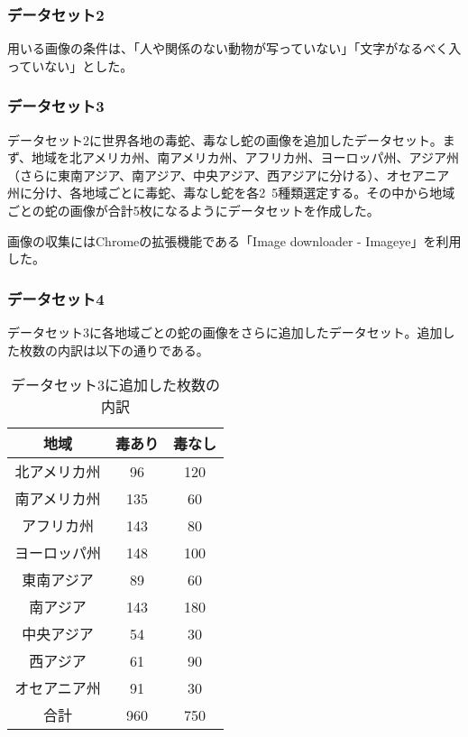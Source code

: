 \documentclass[a4paper, 11pt, titlepage]{jsarticle}
\begin{document}
\subsubsection{データセット2}
用いる画像の条件は、「人や関係のない動物が写っていない」「文字がなるべく入っていない」とした。\par

\subsubsection{データセット3}
データセット2に世界各地の毒蛇、毒なし蛇の画像を追加したデータセット。まず、地域を北アメリカ州、南アメリカ州、アフリカ州、ヨーロッパ州、アジア州（さらに東南アジア、南アジア、中央アジア、西アジアに分ける）、オセアニア州に分け、各地域ごとに毒蛇、毒なし蛇を各2~5種類選定する。その中から地域ごとの蛇の画像が合計5枚になるようにデータセットを作成した。\par
画像の収集にはChromeの拡張機能である「Image downloader - Imageye」を利用した。\par

\subsubsection{データセット4}
データセット3に各地域ごとの蛇の画像をさらに追加したデータセット。追加した枚数の内訳は以下の通りである。\par
\begin{table}[htb]
\centering
  \caption{データセット3に追加した枚数の内訳}
  \begin{tabular}{|c|c|c|}  \hline
    地域 & 毒あり & 毒なし \\ \hline \hline
    北アメリカ州 & 96 & 120 \\ \hline
    南アメリカ州 & 135 & 60 \\ \hline
    アフリカ州 & 143 & 80 \\ \hline
    ヨーロッパ州 & 148 & 100 \\ \hline
    東南アジア & 89 & 60 \\ \hline
    南アジア & 143 & 180 \\ \hline
    中央アジア & 54 & 30 \\ \hline
    西アジア & 61 & 90 \\ \hline
    オセアニア州 & 91 & 30 \\ \hline \hline
    合計 & 960 & 750 \\ \hline
  \end{tabular}
\end{table}
\end{document}
